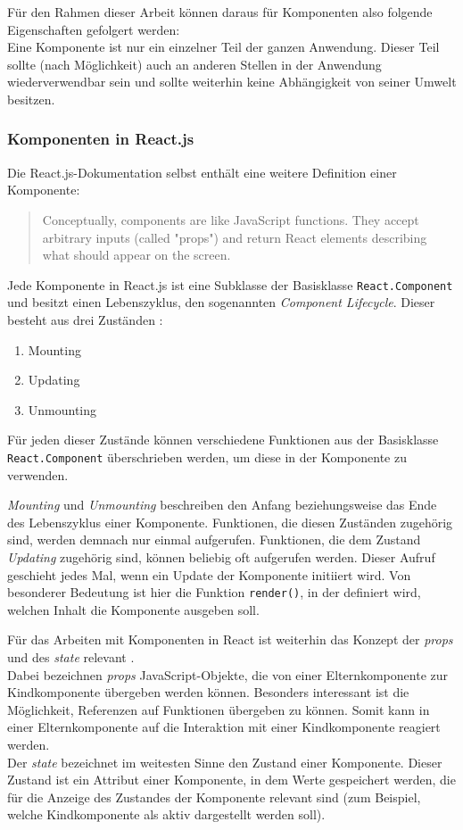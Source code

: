 Für den Rahmen dieser Arbeit können daraus für Komponenten also folgende Eigenschaften gefolgert werden:\\
Eine Komponente ist nur ein einzelner Teil der ganzen Anwendung. Dieser Teil sollte (nach Möglichkeit) auch an anderen Stellen in der Anwendung wiederverwendbar sein und sollte weiterhin keine Abhängigkeit von seiner Umwelt besitzen.

\subsubsection{Komponenten in React.js}
Die React.js-Dokumentation selbst enthält eine weitere Definition einer Komponente:

\begin{quote}
  Conceptually, components are like JavaScript functions. They accept arbitrary inputs (called "props") and return React elements describing what should appear on the screen. \cite{ReactProps}
\end{quote}

Jede Komponente in React.js ist eine Subklasse der Basisklasse \verb|React.Component| und besitzt einen Lebenszyklus, den sogenannten \textit{Component Lifecycle}. Dieser besteht aus drei Zuständen \cite{ReactCom}:

\begin{enumerate}
  \item Mounting
  \item Updating
  \item Unmounting
\end{enumerate}

Für jeden dieser Zustände können verschiedene Funktionen aus der Basisklasse \verb|React.Component| überschrieben werden, um diese in der Komponente zu verwenden.

\textit{Mounting} und \textit{Unmounting} beschreiben den Anfang beziehungsweise das Ende des Lebenszyklus einer Komponente. Funktionen, die diesen Zuständen zugehörig sind, werden demnach nur einmal aufgerufen.
Funktionen, die  dem Zustand \textit{Updating} zugehörig sind, können beliebig oft aufgerufen werden. Dieser Aufruf geschieht jedes Mal, wenn ein Update der Komponente initiiert wird. Von besonderer Bedeutung ist hier die Funktion \verb|render()|, in der definiert wird, welchen Inhalt die Komponente ausgeben soll.

Für das Arbeiten mit Komponenten in React ist weiterhin das Konzept der \textit{props} und des \textit{state} relevant \cite{ReactProps}.\\
Dabei bezeichnen \textit{props} JavaScript-Objekte, die von einer Elternkomponente zur Kindkomponente übergeben werden können. Besonders interessant ist die Möglichkeit, Referenzen auf Funktionen übergeben zu können. Somit kann in einer Elternkomponente auf die Interaktion mit einer Kindkomponente reagiert werden.\\
Der \textit{state} bezeichnet im weitesten Sinne den Zustand einer Komponente. Dieser Zustand ist ein Attribut einer Komponente, in dem Werte gespeichert werden, die für die Anzeige des Zustandes der Komponente relevant sind (zum Beispiel, welche Kindkomponente als aktiv dargestellt werden soll).\\

